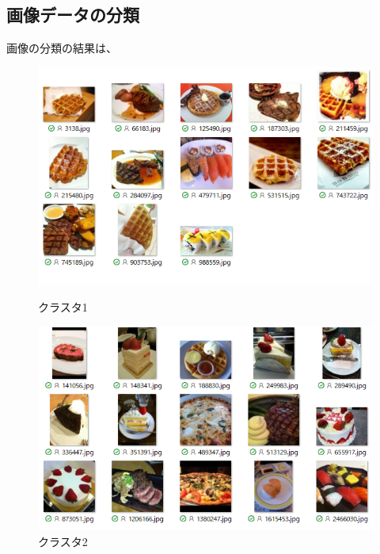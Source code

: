 \documentclass[dvipdfmx]{jsarticle}
\begin{document}
\subsection{画像データの分類}

画像の分類の結果は、
\begin{figure}[htbp]
  \begin{minipage}{0.5\hsize}
    \begin{center}
      \includegraphics[width=1.0\hsize]{./pic/ic1.png}
    \end{center}
    \caption{クラスタ1}
    \label{fig:ic1}
  \end{minipage}
  \begin{minipage}{0.5\hsize}
    \begin{center}
      \includegraphics[width=1.0\hsize]{./pic/ic2.png}
    \end{center}
    \caption{クラスタ2}
    \label{fig:ic2}
  \end{minipage}
\end{figure}
\end{document}
